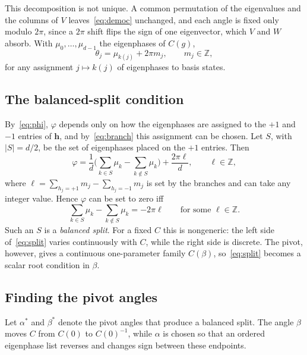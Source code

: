 \documentclass[11pt]{article}
\begin{document}
This decomposition is not unique. A common permutation of the eigenvalues and the columns of $V$
leaves~\eqref{eq:democ} unchanged, and each angle is fixed only modulo $2\pi$, since a $2\pi$ shift
flips the sign of one eigenvector, which $V$ and $W$ absorb. With $\mu_0,\dots,\mu_{d-1}$ the
eigenphases of $C(g)$,
\begin{equation}\label{eq:branch}
\theta_j=\mu_{k(j)}+2\pi m_j,\qquad m_j\in\mathbb Z,
\end{equation}
for any assignment $j\mapsto k(j)$ of eigenphases to basis states.

\subsection{The balanced-split condition}\label{sec:cond}

By~\eqref{eq:phi}, $\varphi$ depends only on how the eigenphases are assigned to the $+1$
and $-1$ entries of $\mathbf h$, and by~\eqref{eq:branch} this assignment can be chosen. Let $S$,
with $|S|=d/2$, be the set of eigenphases placed on the $+1$ entries. Then
\begin{equation}\label{eq:phiS}
\varphi=\frac1d\Big(\sum_{k\in S}\mu_k-\sum_{k\notin S}\mu_k\Big)+\frac{2\pi\ell}{d},\qquad
\ell\in\mathbb Z,
\end{equation}
where $\ell=\sum_{h_j=+1}m_j-\sum_{h_j=-1}m_j$ is set by the branches and can take any integer
value. Hence $\varphi$ can
be set to zero iff
\begin{equation}\label{eq:split}
\sum_{k\in S}\mu_k-\sum_{k\notin S}\mu_k=-2\pi\ell\qquad\text{for some }\ell\in\mathbb Z .
\end{equation}
Such an $S$ is a \emph{balanced split}. For a fixed $C$ this is nongeneric: the left side of~\eqref{eq:split}
varies continuously with $C$, while the right side is discrete. The pivot, however, gives a
continuous one-parameter family $C(\beta)$, so~\eqref{eq:split} becomes a scalar root condition
in $\beta$.

\subsection{Finding the pivot angles}\label{sec:exist}

Let $\alpha^{\ast}$ and $\beta^{\ast}$ denote the pivot angles that produce a balanced split. The angle
$\beta$ moves $C$ from $C(0)$ to $C(0)^{-1}$, while $\alpha$ is chosen so that an ordered
eigenphase list reverses and changes sign between these endpoints.
\end{document}
